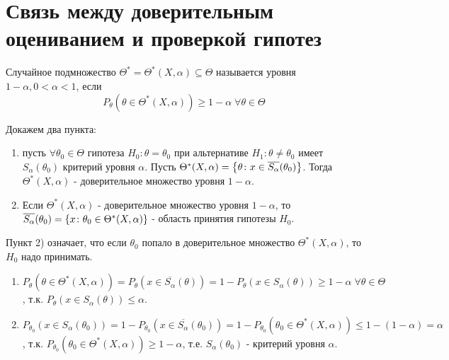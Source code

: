 \section{Связь между доверительным оцениванием и проверкой гипотез}\label{lec:5/sec:1}

\begin{definition}\label{lec:5/def:1}
	Случайное подмножество $\Theta^* = \Theta^* (X, \alpha) \subseteq \Theta$ называется  уровня $1-\alpha, 0 < \alpha < 1$, если
	$$P_{\theta} (\theta \in \Theta^* (X, \alpha)) \ge 1 - \alpha \; \forall \theta \in \Theta$$
\end{definition}

\begin{theorem}[]\label{lec:5/the:1}
	Докажем два пункта:
	\begin{enumerate}
		\item пусть $\forall \theta_0 \in \Theta$ гипотеза $H_0: \theta = \theta_0$ при альтернативе $H_1: \theta \not = \theta_0$ имеет $S_{\alpha}(\theta_0)$ критерий уровня $\alpha$. Пусть $\Theta^* (X, \alpha) = \left\{\theta\colon x \in \overline{S_{\alpha}}(\theta_0)\right\}$. Тогда $\Theta^* (X, \alpha)$ - доверительное множество уровня $1-\alpha$.
		\item Если $\Theta^* (X, \alpha)$ - доверительное множество уровня $1-\alpha$, то $\overline{S_{\alpha}}(\theta_0) = \left\{x\colon\theta_0 \in \Theta^* (X, \alpha)\right\}$ - область принятия гипотезы $H_0$.
	\end{enumerate}
\end{theorem}

\begin{remark}\label{lec:5/remark:1}
	Пункт 2) означает, что если $\theta_0$ попало в доверительное множество $\Theta^* (X, \alpha)$, то $H_0$ надо принимать.
\end{remark}

\begin{Proof}
	\begin{enumerate}
		\item 
			$\displaystyle P_{\theta} (\theta \in \Theta^* (X, \alpha)) = P_{\theta} (x \in \overline{S_{\alpha}}(\theta)) = 1 - P_{\theta} (x \in S_{\alpha}(\theta)) \ge 1 - \alpha \; \forall \theta \in \Theta$, т.к. $P_{\theta}(x \in S_{\alpha}(\theta)) \leq \alpha$.
		\item 
			$\displaystyle P_{\theta_0} (x \in S_{\alpha}(\theta_0)) = 1 - P_{\theta_0}(x \in \overline{S_{\alpha}}(\theta_0)) = 1 - P_{\theta_0} (\theta_0 \in \Theta^*(X, \alpha)) \le 1 - (1-\alpha) = \alpha$, т.к. $\displaystyle P_{\theta_0} (\theta_0 \in \Theta^*(X, \alpha)) \ge 1 - \alpha$, т.е. $\displaystyle S_{\alpha}(\theta_0) \text{ - критерий уровня } \alpha$.
	\end{enumerate}
\end{Proof}


